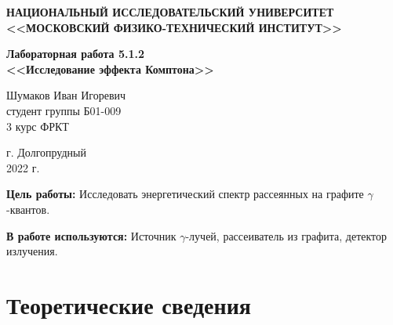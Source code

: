 \documentclass[a4paper,12pt]{article} %
\begin{document}
	
	
	\begin{center}
		
		\textbf{НАЦИОНАЛЬНЫЙ ИССЛЕДОВАТЕЛЬСКИЙ УНИВЕРСИТЕТ \\ <<МОСКОВСКИЙ ФИЗИКО-ТЕХНИЧЕСКИЙ ИНСТИТУТ>>}
		\vspace{13ex}
		
		\textbf{Лабораторная работа 5.1.2\\ <<Исследование эффекта Комптона>>}
		\vspace{40ex}
		
		\normalsize{Шумаков Иван Игоревич \\ студент группы Б01-009\\ 3 курс ФРКТ\\}
	\end{center}
	
	\vfill 
	
	\begin{center}
		г. Долгопрудный\\ 
		2022 г.
	\end{center}
	
	
	\thispagestyle{empty} %
	\newpage


	\textbf{Цель работы:} Исследовать энергетический спектр рассеянных на графите $\gamma$-квантов.\par
  \textbf{В работе используются:} Источник $\gamma$-лучей, рассеиватель из графита, детектор излучения.\par
    
	\section{Теоретические сведения}
\end{document}
